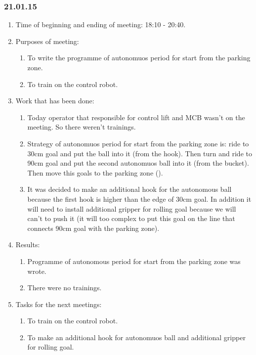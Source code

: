\subsubsection{21.01.15}
\begin{enumerate}
	
	\item Time of beginning and ending of meeting: 18:10 - 20:40.
	
	\item Purposes of meeting: 
	\begin{enumerate}
		
		\item To write the programme of autonomuos period for start from the parking zone.
		
		\item To train on the control robot.
		
	\end{enumerate}

	\item Work that has been done:
	\begin{enumerate}
		
		\item Today operator that responsible for control lift and MCB wasn't on the meeting. So there weren't trainings.
		
		\item Strategy of autonomuos period for start from the parking zone is: ride to 30cm goal and put the ball into it (from the hook). Then turn and ride to 90cm goal and put the second autonomuos ball into it (from the bucket). Then move this goals to the parking zone ().
		
        \item It was decided to make an additional hook for the autonomous ball because the first hook is higher than the edge of 30cm goal. In addition it will need to install additional gripper for rolling goal because we will can't to push it (it will too complex to put this goal on the line that connects 90cm goal with the parking zone).
		
	\end{enumerate}
	
	\item Results:
	\begin{enumerate}
		
		\item Programme of autonomous period for start from the parking zone was wrote.
		
		\item There were no trainings.
		
	\end{enumerate}
	
	\item Tasks for the next meetings:
	\begin{enumerate}
		
		\item To train on the control robot.
		
		\item To make an additional hook for autonomuos ball and additional gripper for rolling goal.
			
	\end{enumerate}
\end{enumerate}
\fillpage
